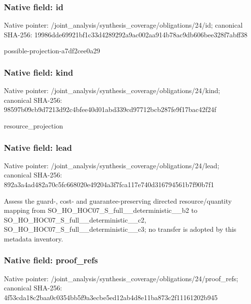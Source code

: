 \documentclass[10pt,a4paper]{article}
\begin{document}
\subsubsection{Native field: id}
Native pointer: /joint\_\allowbreak{}analysis/synthesis\_\allowbreak{}coverage/obligations/24/id; canonical SHA-256: 19986dde69921bf1c33d4289292a9ac002aa914b78ac9db606bee328f7abff38

\begingroup\raggedright\sloppy possible-projection-a7df2cee0a29\par\endgroup

\subsubsection{Native field: kind}
Native pointer: /joint\_\allowbreak{}analysis/synthesis\_\allowbreak{}coverage/obligations/24/kind; canonical SHA-256: 98597b09cb9d7213d92c4bfee40d01abd339cd97712bcb287fe9f17bac42f24f

\begingroup\raggedright\sloppy resource\_\allowbreak{}projection\par\endgroup

\subsubsection{Native field: lead}
Native pointer: /joint\_\allowbreak{}analysis/synthesis\_\allowbreak{}coverage/obligations/24/lead; canonical SHA-256: 892a3a4ad482a70c5fc668020e49204a3f7fca117e740d316794561b7f90b7f1

\begingroup\raggedright\sloppy Assess the guard-,\allowbreak{} cost- and guarantee-preserving directed resource/\allowbreak{}quantity mapping from SO\_\allowbreak{}HO\_\allowbreak{}HOC07\_\allowbreak{}S\_\allowbreak{}full\_\allowbreak{}\_\allowbreak{}deterministic\_\allowbreak{}\_\allowbreak{}b2 to SO\_\allowbreak{}HO\_\allowbreak{}HOC07\_\allowbreak{}S\_\allowbreak{}full\_\allowbreak{}\_\allowbreak{}deterministic\_\allowbreak{}\_\allowbreak{}c2,\allowbreak{} SO\_\allowbreak{}HO\_\allowbreak{}HOC07\_\allowbreak{}S\_\allowbreak{}full\_\allowbreak{}\_\allowbreak{}deterministic\_\allowbreak{}\_\allowbreak{}c3;\allowbreak{} no transfer is adopted by this metadata inventory.\par\endgroup

\subsubsection{Native field: proof\_\allowbreak{}refs}
Native pointer: /joint\_\allowbreak{}analysis/synthesis\_\allowbreak{}coverage/obligations/24/proof\_\allowbreak{}refs; canonical SHA-256: 4f53cda18c2baa0c0354bb5f9a3ecbe5ed12ab4d8e11ba873c2f11161202b945
\end{document}
